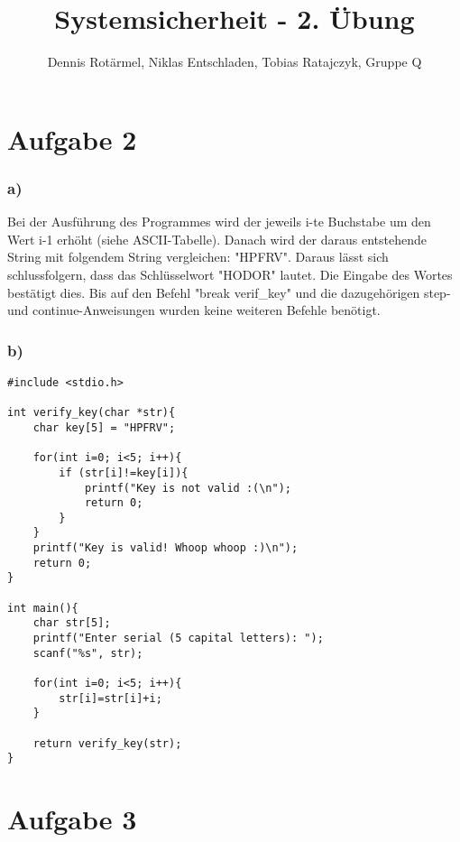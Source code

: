 \documentclass[]{scrreprt}
\title{Systemsicherheit - 2. Übung}
\author{Dennis Rotärmel, Niklas Entschladen, Tobias Ratajczyk, Gruppe Q}
\begin{document}
\maketitle
\chapter{Aufgabe 2}
\subsection*{a)}
Bei der Ausführung des Programmes wird der jeweils i-te Buchstabe um den Wert i-1 erhöht (siehe ASCII-Tabelle).
Danach wird der daraus entstehende String mit folgendem String vergleichen: "HPFRV".
Daraus lässt sich schlussfolgern, dass das Schlüsselwort "HODOR" lautet. Die Eingabe des Wortes bestätigt dies.
Bis auf den Befehl "break verif\_key" und die dazugehörigen step- und continue-Anweisungen wurden keine weiteren Befehle benötigt.
\subsection*{b)}
\begin{lstlisting}
#include <stdio.h>

int verify_key(char *str){
	char key[5] = "HPFRV";

	for(int i=0; i<5; i++){
		if (str[i]!=key[i]){
			printf("Key is not valid :(\n");
			return 0;
		}
	}
	printf("Key is valid! Whoop whoop :)\n");
	return 0;
}
	
int main(){
	char str[5];
	printf("Enter serial (5 capital letters): ");
	scanf("%s", str);
	
	for(int i=0; i<5; i++){
		str[i]=str[i]+i;
	}

	return verify_key(str);
}
\end{lstlisting}
\chapter{Aufgabe 3}
\end{document}
